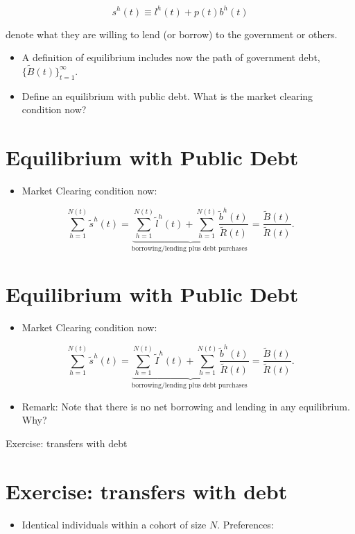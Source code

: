 \documentclass[10pt]{article}
\begin{document}
$$
s^{h}(t) \equiv l^{h}(t)+p(t) b^{h}(t)
$$

denote what they are willing to lend (or borrow) to the government or others.

\begin{itemize}
  \item A definition of equilibrium includes now the path of government debt, $\{\widetilde{B}(t)\}_{t=1}^{\infty}$.
  \item Define an equilibrium with public debt. What is the market clearing condition now?
\end{itemize}

\section*{Equilibrium with Public Debt}
\begin{itemize}
  \item Market Clearing condition now:
\end{itemize}

$$
\sum_{h=1}^{N(t)} \widetilde{s}^{h}(t)=\underbrace{\sum_{h=1}^{N(t)} \widetilde{l}^{h}(t)+\sum_{h=1}^{N(t)} \frac{\widetilde{b}^{h}(t)}{\widetilde{R}(t)}}_{\text {borrowing/lending plus debt purchases }}=\frac{\widetilde{B}(t)}{\widetilde{R}(t)} .
$$

\section*{Equilibrium with Public Debt}
\begin{itemize}
  \item Market Clearing condition now:
\end{itemize}

$$
\sum_{h=1}^{N(t)} \widetilde{s}^{h}(t)=\underbrace{\sum_{h=1}^{N(t)} \widetilde{I}^{h}(t)+\sum_{h=1}^{N(t)} \frac{\widetilde{b}^{h}(t)}{\widetilde{R}(t)}}_{\text {borrowing/lending plus debt purchases }}=\frac{\widetilde{B}(t)}{\widetilde{R}(t)} .
$$

\begin{itemize}
  \item Remark: Note that there is no net borrowing and lending in any equilibrium. Why?
\end{itemize}

Exercise: transfers with debt

\section*{Exercise: transfers with debt}
\begin{itemize}
  \item Identical individuals within a cohort of size $N$. Preferences:
\end{itemize}
\end{document}
